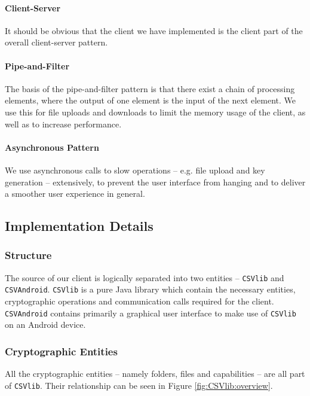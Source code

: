\documentclass[pdftex,english,10pt,b5paper,twoside]{book}
\begin{document}
\paragraph{Client-Server} It should be obvious that the client we have
implemented is the client part of the overall client-server pattern.

\paragraph{Pipe-and-Filter} The basis of the pipe-and-filter pattern is that
there exist a chain of processing elements, where the output of one element is
the input of the next element. We use this for file uploads and downloads to
limit the memory usage of the client, as well as to increase performance.

\paragraph{Asynchronous Pattern} We use asynchronous calls to slow operations
-- e.g. file upload and key generation -- extensively, to prevent the user
interface from hanging and to deliver a smoother user experience in general.

\subsection{Implementation Details}
\label{sec:cli:impl:det}

\subsubsection{Structure}
The source of our client is logically separated into two entities --
\texttt{CSVlib} and \texttt{CSVAndroid}. \texttt{CSVlib} is a pure Java library which
contain the necessary entities, cryptographic operations and communication
calls required for the client. \texttt{CSVAndroid} contains primarily a graphical user
interface to make use of \texttt{CSVlib} on an Android device.

\subsubsection{Cryptographic Entities}
\label{sec:cryptoentities}

All the cryptographic entities -- namely folders, files and capabilities -- are
all part of \texttt{CSVlib}. Their relationship can be seen in Figure
\ref{fig:CSVlib:overview}.
\end{document}
